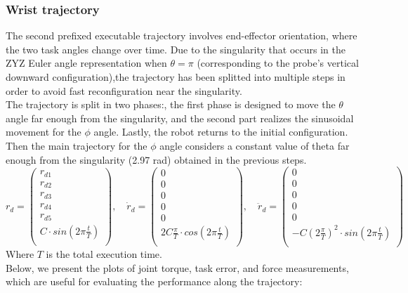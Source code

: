 \documentclass{article}
\begin{document}
\subsubsection{Wrist trajectory}
The second prefixed executable trajectory involves end-effector orientation, where the two task angles change over time. Due to the singularity that occurs in the ZYZ Euler angle representation when $\theta =\pi$ (corresponding to the probe's vertical downward configuration),the trajectory has been splitted into multiple steps in order to avoid fast reconfiguration near  the singularity.\\
The trajectory is split in two phases:, the first phase is  designed to move the $\theta$ angle far enough from the singularity, and the second part realizes the sinusoidal movement for the $\phi$ angle.
Lastly, the robot returns to the initial configuration.
\newline
Then the main trajectory for the $\phi$ angle considers a constant value of theta far enough from the singularity (2.97 rad) obtained in the previous steps.
$$r_{d}=\begin{pmatrix}
r_{d1}\\
r_{d2}\\
r_{d3}\\
r_{d4}\\
r_{d5}\\
C\cdot sin(2\pi \frac{t}{T})\\
\end{pmatrix},
\quad \dot{r}_{d}=\begin{pmatrix}
0\\
0\\
0\\
0\\
0\\
2C\frac{\pi}{T}\cdot cos(2\pi \frac{t}{T})\\
\end{pmatrix},
\quad \ddot{r}_{d}=\begin{pmatrix}
0\\
0\\
0\\
0\\
0\\
-C(2\frac{\pi}{T})^{2}\cdot sin(2\pi \frac{t}{T})\\
\end{pmatrix}
$$
\newline
Where $T$ is the total execution time.\\
Below, we present the plots of joint torque, task error, and force measurements, which are useful for evaluating the performance along the trajectory:\\
\end{document}

